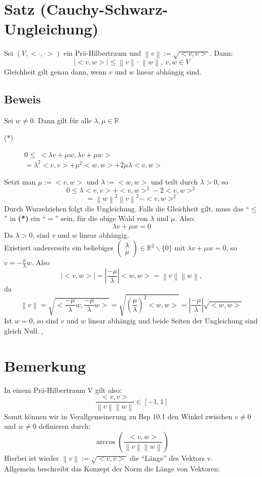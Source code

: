 \documentclass{scrbook}
\begin{document}
\section{Satz (Cauchy-Schwarz-Ungleichung)}
Sei $(V,<\cdot,\cdot >)$ ein Prä-Hilbertraum und $\left\| v\right\| := \sqrt{<v,v>}$. Dann:
\[\left|<v,w>\right| \leq \left\| v\right\| \cdot \left\| w\right\| ,\ v,w\in V\]
Gleichheit gilt genau dann, wenn $v$ und $w$ linear abhängig sind.
\subsection*{Beweis}
Sei $w \neq 0$. Dann gilt für alle $\lambda, \mu \in \mathbb{R}$
\begin{description}
\item[(*)] $0 \leq\ <\lambda v +\mu w, \lambda v +\mu w>$\\
$ = \lambda^2<v,v> +\mu^2<w,w> +2\mu\lambda <v,w>$
\end{description}
Setzt man $\mu := <v,w>$ und $\lambda := <w,w>$ und teilt durch $\lambda >0$, so
\[0 \leq \lambda<v,v> + <v,w>^2 -2<v,w>^2\]
\[= \left\|w\right\|^2\left\|v\right\|^2-<v,w>^2\]
Durch Wurzelziehen folgt die Ungleichung. Falls die Gleichheit gilt, muss das "`$\leq$"' in \textbf{(*)} ein "`$=$"' sein, für die obige Wahl von $\lambda$ und $\mu$. Also:
\[\lambda v +\mu w = 0\]
Da $\lambda >0$, sind $v$ und $w$ linear abhängig.\\
Existiert andererseits ein beliebiges $\left(
\begin{array}{c}
\lambda \\ \mu
\end{array}
\right) \in \mathbb{R}^2 \backslash \{0\}$ mit $\lambda v+ \mu w = 0$, so $v = - \frac{\mu}{\lambda}w$. Also \[\left| <v,w> \right| = \left| \frac{-\mu}{\lambda} \right| <w,w> = \left\|v\right\| \left\| w\right\|,\]
da
\[\left\| v \right\| = \sqrt{<\frac{-\mu}{\lambda} w, \frac{-\mu}{\lambda}w>} = \sqrt{\left(\frac{\mu}{ \lambda}\right)^2 <w,w>} = \left|\frac{-\mu}{\lambda}\right| \sqrt{<w,w>}\]
Ist $w=0$, so sind $v$ und $w$ linear abhängig und beide Seiten der Ungleichung sind gleich Null. $_\square$
\section{Bemerkung}
In einem Prä-Hilbertraum V gilt also:
\[\frac{<v,v>}{\left\|v\right\|\left\|w\right\|} \in [-1,1]\]
Somit können wir in Verallgemeinerung zu Bsp 10.1 den Winkel zwischen $v\neq0$ und $w\neq 0$ definieren durch:
\[\arccos\left(\frac{<v,w>}{\left\|v\right\|\left\|w\right\|}\right)\]
Hierbei ist wieder $\left\| v \right\| := \sqrt{<v,v>}$ die "`Länge"' des Vektors v.\\
Allgemein beschreibt das Konzept der Norm die Länge von Vektoren:
\end{document}
